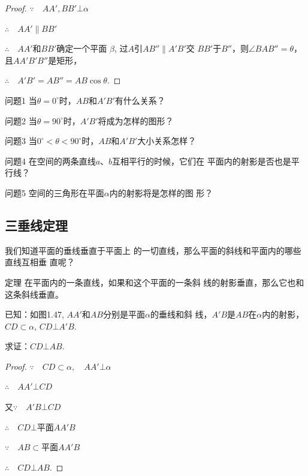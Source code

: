 \begin{proof}
$\because\quad AA',BB'\bot \alpha$

$\therefore\quad AA'\parallel BB'$

$\therefore\quad AA'$和$BB'$确定一个平面
$\beta$, 过$A$引$AB''\parallel A'B'$交
$BB'$于$B''$，则$\angle BAB''=\theta$，
且$AA'B'B''$是矩形，

$\therefore\quad A'B'=AB''=AB\cos\theta$.
\end{proof}

\begin{blk}{问题1}
  当$\theta=0^{\circ}$时，$AB$和$A'B'$有什么关系？
\end{blk}

\begin{blk}{问题2}
  当$\theta=90^{\circ}$时，$A'B'$将成为怎样的图形？
\end{blk}

\begin{blk}{问题3}
  当$0^{\circ}<\theta<90^{\circ}$时，$AB$和$A'B'$大小关系怎样？
\end{blk}


\begin{blk}{问题4}
  在空间的两条直线$a$、$b$互相平行的时候，它们在
  平面内的射影是否也是平行线？
  \end{blk}

\begin{blk}{问题5}
  空间的三角形在平面$\alpha$内的射影将是怎样的图
  形？
  \end{blk}

\subsection{三垂线定理}

我们知道平面的垂线垂直于平面上
  的一切直线，那么平面的斜线和平面内的哪些直线互相垂
  直呢？
  
\begin{blk}
{定理} 在平面内的一条直线，如果和这个平面的一条斜
  线的射影垂直，那么它也和这条斜线垂直。
  \end{blk}

已知：如图1.47, $AA'$和$AB$分别是平面$\alpha$的垂线和斜
线，$A'B$是$AB$在$\alpha$内的射影，$CD\subset \alpha$, $CD\bot A'B$.

求证：$CD\bot AB$.

\begin{proof}
 $\because\quad  CD\subset \alpha,\quad AA'\bot \alpha$

$\therefore\quad  AA'\bot CD$

又$\because\quad A'B\bot CD$

$\therefore\quad CD\bot $平面$AA'B$

$\because\quad AB\subset $平面$AA'B$

$\therefore\quad CD\bot AB$.
\end{proof}

